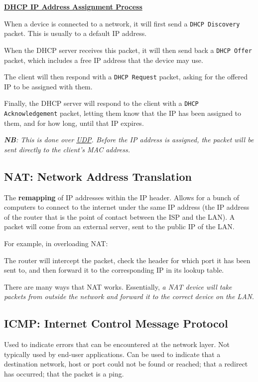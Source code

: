 \documentclass{article}
\begin{document}
\underline{\textbf{DHCP IP Address Assignment Process}}

When a device is connected to a network, it will first send a \texttt{DHCP Discovery} packet. This is usually to a default IP address.

When the DHCP server receives this packet, it will then send back a \texttt{DHCP Offer} packet, which includes a free IP address that the device may use.

The client will then respond with a \texttt{DHCP Request} packet, asking for the offered IP to be assigned with them.

Finally, the DHCP server will respond to the client with a \texttt{DHCP Acknowledgement} packet, letting them know that the IP has been assigned to them, and for how long, until that IP expires.

\textit{\textbf{NB}: This is done over \underline{UDP}. Before the IP address is assigned, the packet will be sent directly to the client's MAC address.}

\subsection{NAT: Network Address Translation}

The \textbf{remapping} of IP addresses within the IP header. Allows for a bunch of computers to connect to the internet under the same IP address (the IP address of the router that is the point of contact between the ISP and the LAN). A packet will come from an external server, sent to the public IP of the LAN. 

For example, in overloading NAT:

The router will intercept the packet, check the header for which port it has been sent to, and then forward it to the corresponding IP in its lookup table.

There are many ways that NAT works. Essentially, \textit{a NAT device will take packets from outside the network and forward it to the correct device on the LAN}.

\subsection{ICMP: Internet Control Message Protocol}

Used to indicate errors that can be encountered at the network layer. Not typically used by end-user applications. Can be used to indicate that a destination network, host or port could not be found or reached; that a redirect has occurred; that the packet is a ping.
\end{document}
